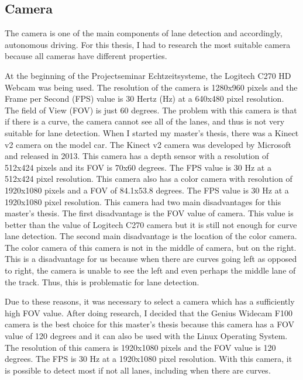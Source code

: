 \subsection{Camera}\label{sec:Camera}


The camera is one of the main components of lane detection and accordingly, autonomous driving. For this thesis, I had 
to research the most suitable camera because all cameras have different properties.

At the beginning of the Projectseminar Echtzeitsysteme, the Logitech C270 HD Webcam was being used. The resolution of 
the camera is 1280x960 pixels and the Frame per Second (FPS) value is 30 Hertz (Hz) at a 640x480 pixel resolution. 
The field of View (FOV) is just 60 degrees. The problem with this camera is that if there is a curve, the camera 
cannot see all of the lanes, and thus is not very suitable for lane detection. When I started my master's thesis, there 
was a Kinect v2 camera on the model car.  The Kinect v2 camera was developed by Microsoft and released in 2013. This 
camera has a depth sensor with a resolution of 512x424 pixels and its FOV is 70x60 degrees. The FPS value is 30 Hz at 
a 512x424 pixel resolution. This camera also has a color camera with resolution of 1920x1080 pixels and a FOV of 
84.1x53.8 degrees. The FPS value is 30 Hz at a 1920x1080 pixel resolution. This camera had two main disadvantages for 
this master's thesis. The first disadvantage is the FOV value of camera. This value is better than the value of Logitech 
C270 camera but it is still not enough for curve lane detection. The second main disadvantage is the location of the 
color camera. The color camera of this camera is not in the middle of camera, but on the right. This is a 
disadvantage for us because when there are curves going left as opposed to right, the camera is unable to see the 
left and even perhaps the middle lane of the track. Thus, this is problematic for lane detection.

Due to these reasons, it was necessary to select a camera which has a sufficiently high FOV value. After doing research, I decided 
that the Genius Widecam F100 camera is the best choice for this master's thesis because this camera has a FOV value of 
120 degrees and it can also be used with the Linux Operating System. The resolution of this camera is 1920x1080 pixels 
and the FOV value is 120 degrees. The FPS is 30 Hz at a 1920x1080 pixel resolution. With this camera, it is possible 
to detect most if not all lanes, including when there are curves. 


